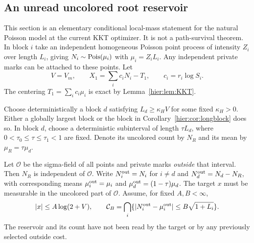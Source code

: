 \subsection{An unread uncolored root reservoir}

This section is an elementary conditional local-mass statement for
the natural Poisson model at the current KKT optimizer. It is not a
path-survival theorem. In block $i$ take an independent homogeneous
Poisson point process of intensity $Z_i$ over length $L_i$, giving
$N_i\sim\operatorname{Pois}(\mu_i)$ with $\mu_i=Z_iL_i$. Any independent private
marks can be attached to these points. Let
\[
 V=V_m,\qquad X_1=\sum_i c_iN_i-T_1,
 \qquad c_i=r_i\log S_i.
\]
The centering $T_1=\sum_ic_i\mu_i$ is exact by
Lemma~\ref{hier:lem:KKT}.

Choose deterministically a block $d$ satisfying $L_d\ge\kappa_H V$
for some fixed $\kappa_H>0$. Either a globally largest block or the
block in Corollary~\ref{hier:cor:longblock} does so. In block $d$, choose
a deterministic subinterval of length $\tau L_d$, where
$0<\tau_0\le\tau\le\tau_1<1$ are fixed. Denote its uncolored count
by $N_R$ and its mean by $\mu_R=\tau\mu_d$.

Let $\mathcal O$ be the sigma-field of all points and private marks
\emph{outside} that interval. Then $N_R$ is independent of
$\mathcal O$. Write $N_i^{\rm out}=N_i$ for $i\ne d$ and
$N_d^{\rm out}=N_d-N_R$, with corresponding means
$\mu_i^{\rm out}=\mu_i$ and $\mu_d^{\rm out}=(1-\tau)\mu_d$.
The target $x$ must be measurable in the uncolored part of
$\mathcal O$. Assume, for fixed $A,B<\infty$,
\begin{equation}
 |x|\le A\log(2+V),\qquad
 \mathcal C_B=\bigcap_i
 \{|N_i^{\rm out}-\mu_i^{\rm out}|
                         \le B\sqrt{1+L_i}\}.
 \label{hier:eq:outsidecentral}
\end{equation}
The reservoir and its count have not been read by the target or by
any previously selected outside cost.

